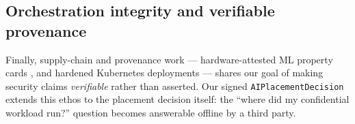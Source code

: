 \subsection{Orchestration integrity and verifiable provenance}
Finally, supply-chain and provenance work --- hardware-attested ML property
cards \cite{duddu2024laminator}, and hardened Kubernetes deployments
\cite{ali2024cmsweb,enyedi2026modrepos} --- shares our goal of making
security claims \emph{verifiable} rather than asserted. Our signed
\texttt{AIPlacementDecision} extends this ethos to the placement decision itself:
the ``where did my confidential workload run?'' question becomes answerable
offline by a third party.

